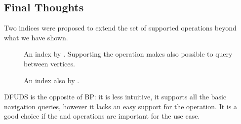 \subsection{Final Thoughts}

Two indices were proposed to extend the set of supported operations beyond what we have shown.
\begin{description}
	\item[\dep{}]
	An index by \cite{jansson2012ultra}.
	Supporting the operation \dep{} makes also possible to query \distance{} between vertices.
	
	\item[\levelAncestor{}]
	An index also by \cite{jansson2012ultra}.
\end{description}

DFUDS is the opposite of BP: it is less intuitive, it supports all the basic navigation queries, however it lacks an easy support for the \dep{} operation.
It is a good choice if the \preRank{} and \childAny{} operations are important for the use case.